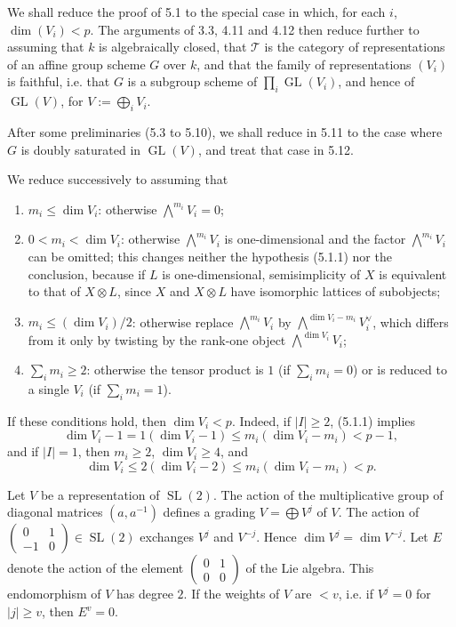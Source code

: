\documentclass[10pt]{article}
\newcommand{\GL}{\operatorname{GL}}
\newcommand{\SL}{\operatorname{SL}}
\newcommand{\T}{\mathcal T}
\theoremstyle{deligne}
\newcommand{\heading}[1]{\vspace{0.7em}\noindent{\bfseries #1}\quad}
\begin{document}
We shall reduce the proof of 5.1 to the special case in which, for each \(i\), \(\dim(V_i)<p\). The arguments of 3.3, 4.11 and 4.12 then reduce further to assuming that \(k\) is algebraically closed, that \(\T\) is the category of representations of an affine group scheme \(G\) over \(k\), and that the family of representations \((V_i)\) is faithful, i.e. that \(G\) is a subgroup scheme of \(\prod_i\GL(V_i)\), and hence of \(\GL(V)\), for \(V:=\bigoplus_iV_i\).

After some preliminaries (5.3 to 5.10), we shall reduce in 5.11 to the case where \(G\) is doubly saturated in \(\GL(V)\), and treat that case in 5.12.

\heading{5.2. Reduction to the case \(\dim(V_i)<p\).}
We reduce successively to assuming that
\begin{enumerate}[label=(\arabic*)]
\item \(m_i\le \dim V_i\): otherwise \(\bigwedge^{m_i}V_i=0\);
\item \(0<m_i<\dim V_i\): otherwise \(\bigwedge^{m_i}V_i\) is one-dimensional and the factor \(\bigwedge^{m_i}V_i\) can be omitted; this changes neither the hypothesis (5.1.1) nor the conclusion, because if \(L\) is one-dimensional, semisimplicity of \(X\) is equivalent to that of \(X\otimes L\), since \(X\) and \(X\otimes L\) have isomorphic lattices of subobjects;
\item \(m_i\le (\dim V_i)/2\): otherwise replace \(\bigwedge^{m_i}V_i\) by \(\bigwedge^{\dim V_i-m_i}V_i^\vee\), which differs from it only by twisting by the rank-one object \(\bigwedge^{\dim V_i}V_i\);
\item \(\sum_i m_i\ge2\): otherwise the tensor product is \(1\) (if \(\sum_i m_i=0\)) or is reduced to a single \(V_i\) (if \(\sum_i m_i=1\)).
\end{enumerate}
If these conditions hold, then \(\dim V_i<p\). Indeed, if \(|I|\ge2\), (5.1.1) implies
\[
  \dim V_i-1=1(\dim V_i-1)\le m_i(\dim V_i-m_i)<p-1,
\]
and if \(|I|=1\), then \(m_i\ge2\), \(\dim V_i\ge4\), and
\[
  \dim V_i\le 2(\dim V_i-2)\le m_i(\dim V_i-m_i)<p.
\]

\heading{5.3.}
Let \(V\) be a representation of \(\SL(2)\). The action of the multiplicative group of diagonal matrices \((a,a^{-1})\) defines a grading \(V=\bigoplus V^j\) of \(V\). The action of \(\begin{pmatrix}0&1\\-1&0\end{pmatrix}\in\SL(2)\) exchanges \(V^j\) and \(V^{-j}\). Hence \(\dim V^j=\dim V^{-j}\). Let \(E\) denote the action of the element \(\begin{pmatrix}0&1\\0&0\end{pmatrix}\) of the Lie algebra. This endomorphism of \(V\) has degree \(2\). If the weights of \(V\) are \(<v\), i.e. if \(V^j=0\) for \(|j|\ge v\), then \(E^v=0\).
\end{document}
